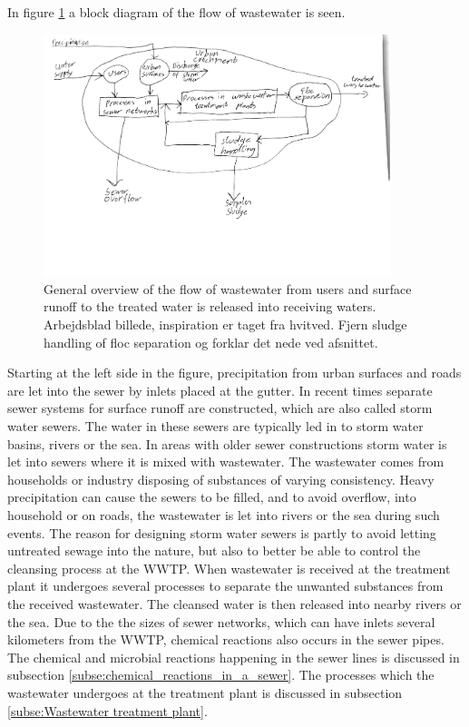 In figure \ref{fig:sewer_overview_of_the_different_parts} a block diagram of the flow of wastewater is seen.
\begin{figure}[H]
\centering
\includegraphics[width=0.9\textwidth]{report/introduction/pictures/sewer_process2.pdf}
\caption{General overview of the flow of wastewater from users and surface runoff to the treated water is released into receiving waters. Arbejdsblad billede, inspiration er taget fra hvitved. Fjern sludge handling of floc separation og forklar det nede ved afsnittet.}
\label{fig:sewer_overview_of_the_different_parts}
\end{figure}

Starting at the left side in the figure, precipitation from urban surfaces and roads are let into the sewer by inlets placed at the gutter. In recent times separate sewer systems for surface runoff are constructed, which are also called storm water sewers. The water in these sewers are typically led in to storm water basins, rivers or the sea. In areas with older sewer constructions storm water is let into sewers where it is mixed with wastewater. The wastewater comes from households or industry disposing of substances of varying consistency. Heavy precipitation can cause the sewers to be filled, and to avoid overflow, into household or on roads, the wastewater is let into rivers or the sea during such events. 
The reason for designing storm water sewers is partly to avoid letting untreated sewage into the nature, but also to better be able to control the cleansing process at the WWTP. %
When wastewater is received at the treatment plant it undergoes several processes to separate the unwanted substances from the received wastewater. The cleansed water is then released into nearby rivers or the sea.
Due to the the sizes of sewer networks, which can have inlets several kilometers from the WWTP, chemical reactions also occurs in the sewer pipes.
The chemical and microbial reactions happening in the sewer lines is discussed in subsection \ref{subse:chemical_reactions_in_a_sewer}. The processes which the wastewater undergoes at the treatment plant is discussed in subsection \ref{subse:Wastewater treatment plant}.  

